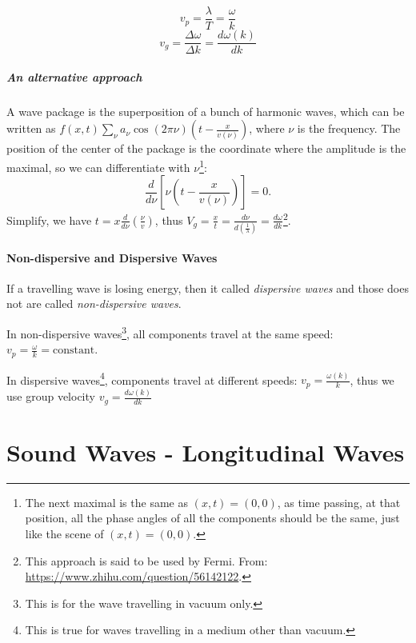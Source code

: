 \documentclass[UTF8]{book}
\begin{document}
\begin{equation}\label{eq:12}
v_p=\frac{\lambda }{T}=\frac{\omega }{k}
\end{equation}
\begin{equation}\label{eq:13}
v_g=\frac{\Delta \omega }{\Delta k}=\frac{d\omega (k)}{dk}
\end{equation}

\paragraph{An alternative approach}
A wave package is the superposition of a bunch of harmonic
waves, which can be written as $f(x,t)\sum_\nu a_\nu 
\cos(2\pi\nu)\left(t-\frac{x}{v(\nu)}\right)$, where 
$\nu$ is the frequency. The position of the center of the
package is the coordinate where the amplitude is the maximal,
so we can differentiate with $\nu$\footnote{The next maximal is
the same as $(x,t)=(0,0)$, as time passing, at that position,
all the phase angles of all the components should be the same,
just like the scene of $(x,t)=(0,0)$.}:
\[\frac{d}{d\nu}[\nu(t-\frac{x}{v(\nu)})]=0.\]
Simplify, we have $t=x\frac{d}{d\nu}(\frac{\nu}{v})$, thus 
$V_g=\frac{x}{t}=\frac{d\nu}{d(\frac{1}{\lambda})}=\frac{d\omega}{dk}$\footnote{This approach is said to be used by Fermi. From: 
\url{https://www.zhihu.com/question/56142122}.}.


\subsubsection{Non-dispersive and Dispersive Waves}
If a travelling wave is losing energy, then it called \emph{dispersive waves} and those does not are called \emph{non-dispersive waves}.

In non-dispersive waves\footnote{This is for the wave travelling in vacuum only.}, all components travel at the same speed: $v_p=\frac{\omega }{k}=\text{constant}$.

In dispersive waves\footnote{This is true for waves travelling in a medium other than vacuum.}, components travel at different speeds: $v_p=\frac{\omega (k)}{k}$, thus we use group velocity $v_g=\frac{d\omega (k)}{dk}$




\chapter{Sound Waves - Longitudinal Waves}
\end{document}
